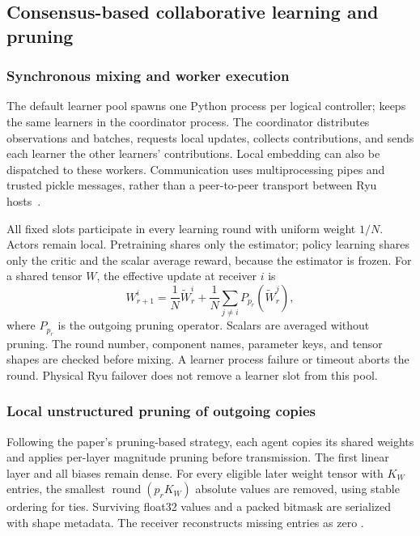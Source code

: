 \documentclass[11pt,a4paper]{article}
\newcommand{\code}[1]{\texttt{\detokenize{#1}}}
\begin{document}
\subsection{Consensus-based collaborative learning and pruning}
\label{sec:consensus}

\subsubsection{Synchronous mixing and worker execution}

The default learner pool spawns one Python process per logical controller;
\code{--workers local} keeps the same learners in the coordinator process.
The coordinator distributes observations and batches, requests local updates,
collects contributions, and sends each learner the other learners'
contributions. Local embedding can also be dispatched to these workers.
Communication uses multiprocessing pipes and trusted pickle messages, rather
than a peer-to-peer transport between Ryu hosts~\cite{code-workers}.

All fixed slots participate in every learning round with uniform weight
$1/N$. Actors remain local. Pretraining shares only the estimator;
policy learning shares only the critic and the scalar average reward, because
the estimator is frozen. For a shared tensor $W$, the effective update at
receiver $i$ is
\begin{equation}
 W^i_{r+1}=\frac{1}{N}\widetilde W^i_r+
          \frac{1}{N}\sum_{j\ne i}P_{p_r}(\widetilde W^j_r),
 \label{eq:mix}
\end{equation}
where $P_{p_r}$ is the outgoing pruning operator. Scalars are averaged without
pruning. The round number, component names, parameter keys, and tensor shapes
are checked before mixing. A learner process failure or timeout aborts the
round. Physical Ryu failover does not remove a learner slot from this pool.

\subsubsection{Local unstructured pruning of outgoing copies}

Following the paper's pruning-based strategy, each agent copies its shared
weights and applies per-layer magnitude pruning before transmission. The
first linear layer and all biases remain dense. For every eligible later
weight tensor with $K_W$ entries, the smallest
$\operatorname{round}(p_rK_W)$ absolute values are removed, using stable
ordering for ties. Surviving float32 values and a packed bitmask are serialized
with shape metadata. The receiver reconstructs missing entries as zero
\cite{code-consensus}.
\end{document}
